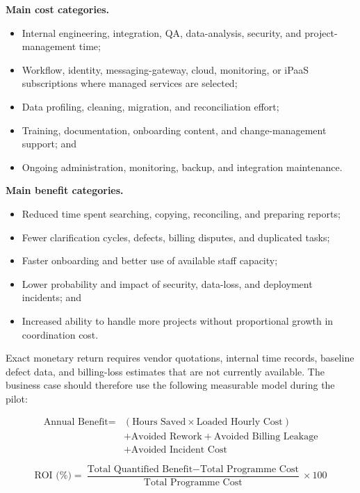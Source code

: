 \documentclass[12pt,a4paper]{report}
\begin{document}
\textbf{Main cost categories.}
\begin{itemize}[leftmargin=1.6em]
    \item Internal engineering, integration, QA, data-analysis, security, and project-management time;
    \item Workflow, identity, messaging-gateway, cloud, monitoring, or iPaaS subscriptions where
          managed services are selected;
    \item Data profiling, cleaning, migration, and reconciliation effort;
    \item Training, documentation, onboarding content, and change-management support; and
    \item Ongoing administration, monitoring, backup, and integration maintenance.
\end{itemize}

\textbf{Main benefit categories.}
\begin{itemize}[leftmargin=1.6em]
    \item Reduced time spent searching, copying, reconciling, and preparing reports;
    \item Fewer clarification cycles, defects, billing disputes, and duplicated tasks;
    \item Faster onboarding and better use of available staff capacity;
    \item Lower probability and impact of security, data-loss, and deployment incidents; and
    \item Increased ability to handle more projects without proportional growth in coordination cost.
\end{itemize}

Exact monetary return requires vendor quotations, internal time records, baseline defect data, and
billing-loss estimates that are not currently available. The business case should therefore use the
following measurable model during the pilot:

\begin{equation}
\begin{aligned}
\text{Annual Benefit} ={}&
(\text{Hours Saved} \times \text{Loaded Hourly Cost}) \\
&+ \text{Avoided Rework} + \text{Avoided Billing Leakage} \\
&+ \text{Avoided Incident Cost}
\end{aligned}
\end{equation}

\begin{equation}
\text{ROI (\%)} =
\frac{\text{Total Quantified Benefit} - \text{Total Programme Cost}}
{\text{Total Programme Cost}} \times 100
\end{equation}
\end{document}
